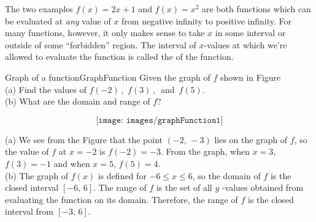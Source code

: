 The two examples $f(x)=2x+1$ and $f(x)=x^2$ are both functions which
can be evaluated at {\it any} value of $x$ from negative infinity to
positive infinity.  For many functions, however, it only makes sense to
take $x$ in some interval or outside of some ``forbidden'' region.  The
interval of $x$-values at which we're allowed to evaluate the function is
called the  of the function.

\begin{minipage}{0.6\textwidth}
	\begin{example}{Graph of a function}{GraphFunction}
		Given the graph of $f$ shown in Figure~\\
		(a)  Find the values of $f(-2)\, , \,\, f(3) \, , \,$ and $\, f(5)$. \\
		(b) What are the domain and range of $f$?\\
	\end{example}
	\vspace{2.5cm}
\end{minipage}
\begin{minipage}{0.4\textwidth}
	\begin{figure}[H]
		$$\texttt{[image: images/graphFunction1]}$$
		\caption{ \label{fig:graphF}} 
	\end{figure}
\end{minipage}

\vspace{-2.5cm}
\begin{minipage}{0.6\textwidth}
	\begin{solution}
		(a) We see from the Figure  that the point $(-2, \,-3)$ lies on the graph of $f$, so the value of $f$ at $x=-2$ is $f(-2)=-3$. From the graph, when $x=3$, $f(3)=-1$ and when $x=5$, $f(5)=4$. \\
		(b) The graph of $f(x)$ is defined for $\displaystyle{-6 \leq x \leq 6}$, so the domain of $f$ is the closed interval $[-6, \, 6]$. The range of $f$ is the set of all $y$ -values obtained from evaluating the function on its domain. Therefore, the range of $f$ is the  closed interval from $[-3, \, 6]$. 
	\end{solution}
\end{minipage}	

